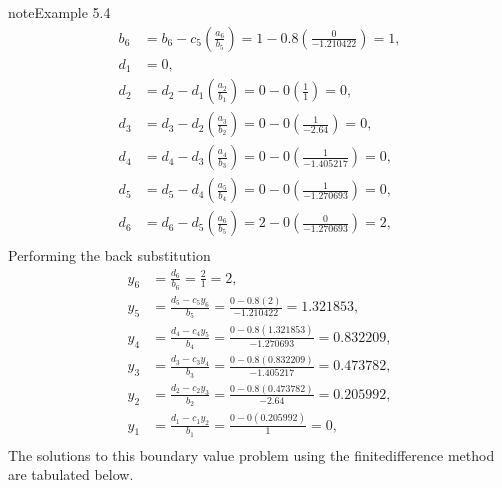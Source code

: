 \documentclass[letterpaper,10pt,english]{jupyterBook}
\begin{document}
\begin{sphinxadmonition}{note}{Example 5.4}
\begin{align*}
    b_6 &= b_6 - c_5 \left( \frac{a_6}{b_5} \right) = 1 - 0.8 \left( \frac{0}{-1.210422} \right) = 1, \\
    d_1 &= 0, \\
    d_2 &= d_2 - d_1 \left( \frac{a_2}{b_1} \right) = 0 - 0 \left( \frac{1}{1} \right) = 0, \\
    d_3 &= d_3 - d_2 \left( \frac{a_3}{b_2} \right) = 0 - 0 \left( \frac{1}{-2.64} \right) = 0, \\
    d_4 &= d_4 - d_3 \left( \frac{a_4}{b_3} \right) = 0 - 0 \left( \frac{1}{-1.405217} \right) = 0, \\
    d_5 &= d_5 - d_4 \left( \frac{a_5}{b_4} \right) = 0 - 0 \left( \frac{1}{-1.270693} \right) = 0, \\
    d_6 &= d_6 - d_5 \left( \frac{a_6}{b_5} \right) = 2 - 0 \left( \frac{0}{-1.270693} \right) = 2, \\
\end{align*}
\sphinxAtStartPar
Performing the back substitution
\begin{align*}
    y_6 &= \frac{d_6}{b_6} = \frac{2}{1} = 2, \\
    y_5 &= \frac{d_5 - c_5 y_6}{b_5} = \frac{0 - 0.8(2)}{-1.210422} = 1.321853, \\
    y_4 &= \frac{d_4 - c_4 y_5}{b_4} = \frac{0 - 0.8(1.321853)}{-1.270693} = 0.832209, \\
    y_3 &= \frac{d_3 - c_3 y_4}{b_3} = \frac{0 - 0.8(0.832209)}{-1.405217} = 0.473782, \\
    y_2 &= \frac{d_2 - c_2 y_3}{b_2} = \frac{0 - 0.8(0.473782)}{-2.64} = 0.205992, \\
    y_1 &= \frac{d_1 - c_1 y_2}{b_1} = \frac{0 - 0(0.205992)}{1} = 0, \\
\end{align*}
\sphinxAtStartPar
The solutions to this boundary value problem using the finite\sphinxhyphen{}difference method are tabulated below.



\end{sphinxadmonition}
\end{document}
